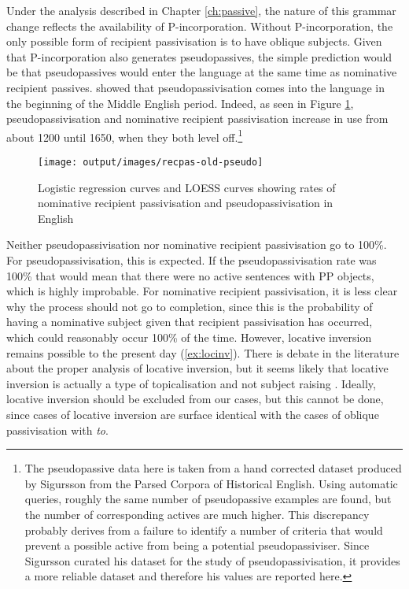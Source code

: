 	Under the analysis described in Chapter \ref{ch:passive}, the nature of this grammar change reflects the availability of P-incorporation. Without P-incorporation, the only possible form of recipient passivisation is to have oblique subjects. Given that P-incorporation also generates pseudopassives, the simple prediction would be that pseudopassives would enter the language at the same time as nominative recipient passives. \cite{Sigursson.2014} showed that pseudopassivisation comes into the language in the beginning of the Middle English period. Indeed, as seen in Figure \ref{fig:recpas-pseudo}, pseudopassivisation and nominative recipient passivisation increase in use from about 1200 until 1650, when they both level off.\footnote{The pseudopassive data here is taken from a hand corrected dataset produced by Sigursson from the Parsed Corpora of Historical English. Using automatic queries, roughly the same number of pseudopassive examples are found, but the number of corresponding actives are much higher. This discrepancy probably derives from a failure to identify a number of criteria that would prevent a possible active from being a potential pseudopassiviser. Since Sigursson curated his dataset for the study of pseudopassivisation, it provides a more reliable dataset and therefore his values are reported here.}

	\begin{figure}[ht!]
		\texttt{[image: output/images/recpas-old-pseudo]}
		\caption{Logistic regression curves and LOESS curves showing rates of nominative recipient passivisation and pseudopassivisation in English}
		\label{fig:recpas-pseudo}
	\end{figure}

	Neither pseudopassivisation nor nominative recipient passivisation go to 100\%. For pseudopassivisation, this is expected. If the pseudopassivisation rate was 100\% that would mean that there were no active sentences with PP objects, which is highly improbable. For nominative recipient passivisation, it is less clear why the process should not go to completion, since this is the probability of having a nominative subject given that recipient passivisation has occurred, which could reasonably occur 100\% of the time. However, locative inversion remains possible to the present day (\ref{ex:locinv}). There is debate in the literature about the proper analysis of locative inversion, but it seems likely that locative inversion is actually a type of topicalisation and not subject raising \citep{Bresnan.1994}. Ideally, locative inversion should be excluded from our cases, but this cannot be done, since cases of locative inversion are surface identical with the cases of oblique passivisation with \textit{to}.

